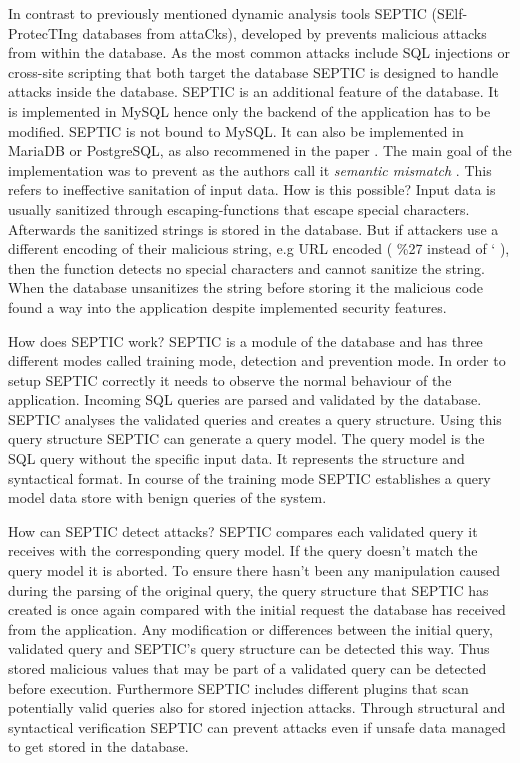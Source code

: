 In contrast to previously mentioned dynamic analysis tools SEPTIC (SElf-ProtecTIng databases from attaCks), developed by \textcite[]{Medeiros2019} prevents malicious attacks from within the database. As the most common attacks include SQL injections or cross-site scripting that both target the database SEPTIC is designed to handle attacks inside the database. SEPTIC is an additional feature of the database. It is implemented in MySQL hence only the backend of the application has to be modified. SEPTIC is not bound to MySQL. It can also be implemented in MariaDB or PostgreSQL, as also recommened in the paper \autocite[1185]{Medeiros2019}.\newline
The main goal of the implementation was to prevent as the authors call it \textit{semantic mismatch} \autocite[1168]{Medeiros2019}. This refers to ineffective sanitation of input data. How is this possible? Input data is usually sanitized through escaping-functions that escape special characters. Afterwards the sanitized strings is stored in the database. But if attackers use a different encoding of their malicious string, e.g URL encoded ( \%27 instead of ` ), then the function detects no special characters and cannot sanitize the string. When the database unsanitizes the string before storing it the malicious code found a way into the application despite implemented security features.\newline


How does SEPTIC work? SEPTIC is a module of the database and has three different modes called training mode, detection and prevention mode. In order to setup SEPTIC correctly it needs to observe the normal behaviour of the application. Incoming SQL queries are parsed and validated by the database. SEPTIC analyses the validated queries and creates a query structure. Using this query structure SEPTIC can generate a query model. The query model is the SQL query without the specific input data. It represents the structure and syntactical format. In course of the training mode SEPTIC establishes a query model data store with benign queries of the system\autocite[1169-1172]{Medeiros2019}.\newline


How can SEPTIC detect attacks? SEPTIC compares each validated query it receives with the corresponding query model. If the query doesn't match the query model it is aborted. To ensure there hasn't been any manipulation caused during the parsing of the original query, the query structure that SEPTIC has created is once again compared with the initial request the database has received from the application. Any modification or differences between the initial query, validated query and SEPTIC's query structure can be detected this way. Thus stored malicious values that may be part of a validated query can be detected before execution. Furthermore SEPTIC includes different plugins that scan potentially valid queries also for stored injection attacks. Through structural and syntactical verification SEPTIC can prevent attacks even if unsafe data managed to get stored in the database\autocite[1173-1175]{Medeiros2019}.

